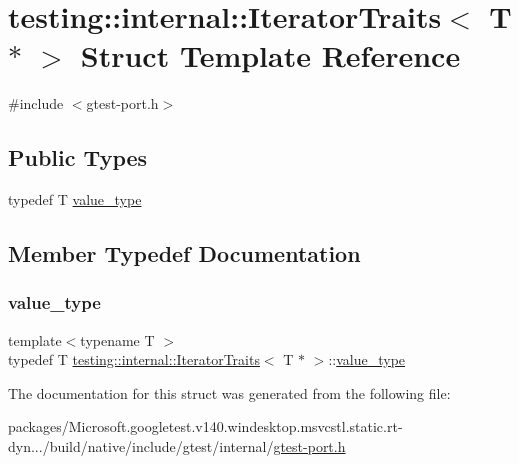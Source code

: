 \hypertarget{structtesting_1_1internal_1_1_iterator_traits_3_01_t_01_5_01_4}{}\section{testing\+::internal\+::Iterator\+Traits$<$ T $\ast$ $>$ Struct Template Reference}
\label{structtesting_1_1internal_1_1_iterator_traits_3_01_t_01_5_01_4}


{\ttfamily \#include $<$gtest-\/port.\+h$>$}

\subsection*{Public Types}
\begin{DoxyCompactItemize}
\item 
typedef T \mbox{\hyperlink{structtesting_1_1internal_1_1_iterator_traits_3_01_t_01_5_01_4_a7e46869ed36cc5aea898e243d270a8be}{value\+\_\+type}}
\end{DoxyCompactItemize}


\subsection{Member Typedef Documentation}
\mbox{\label{structtesting_1_1internal_1_1_iterator_traits_3_01_t_01_5_01_4_a7e46869ed36cc5aea898e243d270a8be}} 
\subsubsection{\texorpdfstring{value\_type}{value\_type}}
{\footnotesize\ttfamily template$<$typename T $>$ \\
typedef T \mbox{\hyperlink{structtesting_1_1internal_1_1_iterator_traits}{testing\+::internal\+::\+Iterator\+Traits}}$<$ T $\ast$ $>$\+::\mbox{\hyperlink{structtesting_1_1internal_1_1_iterator_traits_3_01_t_01_5_01_4_a7e46869ed36cc5aea898e243d270a8be}{value\+\_\+type}}}



The documentation for this struct was generated from the following file\+:\begin{DoxyCompactItemize}
\item 
packages/\+Microsoft.\+googletest.\+v140.\+windesktop.\+msvcstl.\+static.\+rt-\/dyn.../build/native/include/gtest/internal/\mbox{\hyperlink{gtest-port_8h}{gtest-\/port.\+h}}\end{DoxyCompactItemize}
